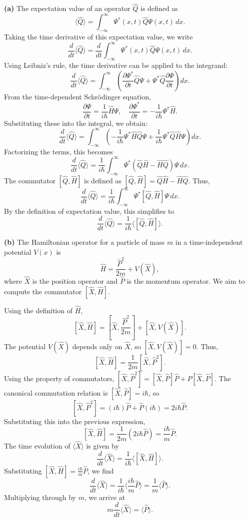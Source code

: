 \documentclass{article}
\begin{document}
\textbf{(a)}  
The expectation value of an operator $\hat{Q}$ is defined as  
\[
\langle \hat{Q} \rangle = \int_{-\infty}^\infty \Psi^*(x,t) \hat{Q} \Psi(x,t) \, dx.
\]  
Taking the time derivative of this expectation value, we write  
\[
\frac{d}{dt} \langle \hat{Q} \rangle = \frac{d}{dt} \int_{-\infty}^\infty \Psi^*(x,t) \hat{Q} \Psi(x,t) \, dx.
\]  
Using Leibniz's rule, the time derivative can be applied to the integrand:  
\[
\frac{d}{dt} \langle \hat{Q} \rangle = \int_{-\infty}^\infty \left( \frac{\partial \Psi^*}{\partial t} \hat{Q} \Psi + \Psi^* \hat{Q} \frac{\partial \Psi}{\partial t} \right) dx.
\]  
From the time-dependent Schrödinger equation,  
\[
\frac{\partial \Psi}{\partial t} = \frac{1}{i\hbar} \hat{H} \Psi, \quad \frac{\partial \Psi^*}{\partial t} = -\frac{1}{i\hbar} \Psi^* \hat{H}.
\]  
Substituting these into the integral, we obtain:  
\[
\frac{d}{dt} \langle \hat{Q} \rangle = \int_{-\infty}^\infty \left( -\frac{1}{i\hbar} \Psi^* \hat{H} \hat{Q} \Psi + \frac{1}{i\hbar} \Psi^* \hat{Q} \hat{H} \Psi \right) dx.
\]  
Factorizing the terms, this becomes  
\[
\frac{d}{dt} \langle \hat{Q} \rangle = \frac{1}{i\hbar} \int_{-\infty}^\infty \Psi^* \left( \hat{Q} \hat{H} - \hat{H} \hat{Q} \right) \Psi \, dx.
\]  
The commutator $[\hat{Q}, \hat{H}]$ is defined as $[\hat{Q}, \hat{H}] = \hat{Q}\hat{H} - \hat{H}\hat{Q}$. Thus,  
\[
\frac{d}{dt} \langle \hat{Q} \rangle = \frac{1}{i\hbar} \int_{-\infty}^\infty \Psi^* [\hat{Q}, \hat{H}] \Psi \, dx.
\]  
By the definition of expectation value, this simplifies to  
\[
\frac{d}{dt} \langle \hat{Q} \rangle = \frac{1}{i\hbar} \langle [\hat{Q}, \hat{H}] \rangle.
\]  

\textbf{(b)}  
The Hamiltonian operator for a particle of mass $m$ in a time-independent potential $V(x)$ is  
\[
\hat{H} = \frac{\hat{P}^2}{2m} + V(\hat{X}),
\]  
where $\hat{X}$ is the position operator and $\hat{P}$ is the momentum operator. We aim to compute the commutator $[\hat{X}, \hat{H}]$.

Using the definition of $\hat{H}$,  
\[
[\hat{X}, \hat{H}] = \left[\hat{X}, \frac{\hat{P}^2}{2m} \right] + [\hat{X}, V(\hat{X})].
\]  
The potential $V(\hat{X})$ depends only on $\hat{X}$, so $[\hat{X}, V(\hat{X})] = 0$. Thus,  
\[
[\hat{X}, \hat{H}] = \frac{1}{2m} [\hat{X}, \hat{P}^2].
\]  
Using the property of commutators, $[\hat{X}, \hat{P}^2] = [\hat{X}, \hat{P}] \hat{P} + \hat{P} [\hat{X}, \hat{P}]$. The canonical commutation relation is $[\hat{X}, \hat{P}] = i\hbar$, so  
\[
[\hat{X}, \hat{P}^2] = (i\hbar) \hat{P} + \hat{P} (i\hbar) = 2i\hbar \hat{P}.
\]  
Substituting this into the previous expression,  
\[
[\hat{X}, \hat{H}] = \frac{1}{2m} (2i\hbar \hat{P}) = \frac{i\hbar}{m} \hat{P}.
\]  
The time evolution of $\langle \hat{X} \rangle$ is given by  
\[
\frac{d}{dt} \langle \hat{X} \rangle = \frac{1}{i\hbar} \langle [\hat{X}, \hat{H}] \rangle.
\]  
Substituting $[\hat{X}, \hat{H}] = \frac{i\hbar}{m} \hat{P}$, we find  
\[
\frac{d}{dt} \langle \hat{X} \rangle = \frac{1}{i\hbar} \langle \frac{i\hbar}{m} \hat{P} \rangle = \frac{1}{m} \langle \hat{P} \rangle.
\]  
Multiplying through by $m$, we arrive at  
\[
m \frac{d}{dt} \langle \hat{X} \rangle = \langle \hat{P} \rangle.
\]
\end{document}
